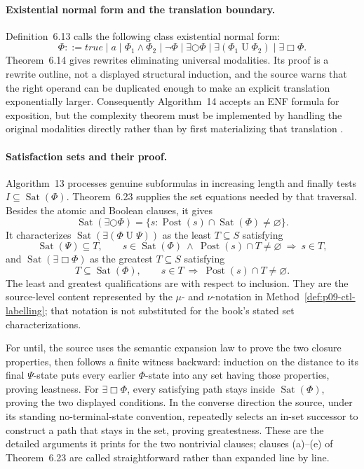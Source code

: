 \paragraph{Existential normal form and the translation boundary.}
Definition~6.13 calls the following class existential normal form:
\[
 \Phi::=true\mid a\mid\Phi_1\land\Phi_2\mid\neg\Phi
       \mid\exists\bigcirc\Phi
       \mid\exists(\Phi_1\mathbin{U}\Phi_2)
       \mid\exists\Box\Phi.
\]
Theorem~6.14 gives rewrites eliminating universal modalities.  Its proof is a
rewrite outline, not a displayed structural induction, and the source warns
that the right operand can be duplicated enough to make an explicit
translation exponentially larger.  Consequently Algorithm~14 accepts an ENF
formula for exposition, but the complexity theorem must be implemented by
handling the original modalities directly rather than by first materializing
that translation \cite[pp.~332--333, 355]{BaierKatoen2008}.

\paragraph{Satisfaction sets and their proof.}
Algorithm~13 processes genuine subformulas in increasing length and finally
tests \(I\subseteq\operatorname{Sat}(\Phi)\).  Theorem~6.23 supplies the
set equations needed by that traversal.  Besides the atomic and Boolean
clauses, it gives
\[
 \operatorname{Sat}(\exists\bigcirc\Phi)
 =\{s:\operatorname{Post}(s)\cap\operatorname{Sat}(\Phi)\ne\varnothing\}.
\]
It characterizes \(\operatorname{Sat}(\exists(\Phi\mathbin{U}\Psi))\) as
the least \(T\subseteq S\) satisfying
\[
 \operatorname{Sat}(\Psi)\subseteq T,
 \qquad
 s\in\operatorname{Sat}(\Phi)\ \land\
 \operatorname{Post}(s)\cap T\ne\varnothing
 \ \Longrightarrow\ s\in T,
\]
and \(\operatorname{Sat}(\exists\Box\Phi)\) as the greatest
\(T\subseteq S\) satisfying
\[
 T\subseteq\operatorname{Sat}(\Phi),
 \qquad
 s\in T\ \Longrightarrow\
 \operatorname{Post}(s)\cap T\ne\varnothing.
\]
The least and greatest qualifications are with respect to inclusion.  They
are the source-level content represented by the \(\mu\)- and \(\nu\)-notation
in Method~\ref{def:p09-ctl-labelling}; that notation is not substituted
for the book's stated set characterizations.

For until, the source uses the semantic expansion law to prove the two closure
properties, then follows a finite witness backward: induction on the distance
to its final \(\Psi\)-state puts every earlier \(\Phi\)-state into any set
having those properties, proving leastness.  For \(\exists\Box\Phi\), every
satisfying path stays inside \(\operatorname{Sat}(\Phi)\), proving the two
displayed conditions.  In the converse direction the source, under its
standing no-terminal-state convention, repeatedly selects an in-set successor
to construct a path that stays in the set, proving greatestness.  These are the
detailed arguments it prints for the two nontrivial clauses; clauses (a)--(e)
of Theorem~6.23 are called straightforward rather than expanded line by line.

